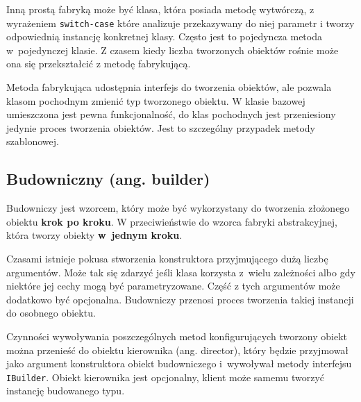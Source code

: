 Inną prostą fabryką może być klasa, która posiada metodę wytwórczą, z wyrażeniem \texttt{switch-case} które analizuje przekazywany do niej parametr i tworzy odpowiednią instancję konkretnej klasy. Często jest to pojedyncza metoda w~pojedynczej klasie. Z czasem kiedy liczba tworzonych obiektów rośnie może ona się przekształcić z metodę fabrykującą. 

Metoda fabrykująca udostępnia interfejs do tworzenia obiektów, ale pozwala klasom pochodnym zmienić typ tworzonego obiektu. W klasie bazowej umieszczona jest pewna funkcjonalność, do klas pochodnych jest przeniesiony jedynie proces tworzenia obiektów. Jest to szczególny przypadek metody szablonowej.
%	
%
%

\subsection{Budowniczny (ang. builder)}\label{lab2/sec/builderPattern}
Budowniczy jest wzorcem, który może być wykorzystany do tworzenia złożonego obiektu \textbf{krok po kroku}. W przeciwieństwie do wzorca fabryki abstrakcyjnej, która tworzy obiekty \textbf{w~jednym kroku}.

Czasami istnieje pokusa stworzenia konstruktora przyjmującego dużą liczbę argumentów. Może tak się zdarzyć jeśli klasa korzysta z~wielu zależności albo gdy niektóre jej cechy mogą być parametryzowane. Część z tych argumentów może dodatkowo być opcjonalna. Budowniczy przenosi proces tworzenia takiej instancji do osobnego obiektu. 

Czynności wywoływania poszczególnych metod konfigurujących tworzony obiekt można przenieść do obiektu kierownika (ang. director), który będzie przyjmował jako argument konstruktora obiekt budowniczego i~wywoływał metody interfejsu \texttt{IBuilder}. Obiekt kierownika jest opcjonalny, klient może samemu tworzyć instancję budowanego typu. 


